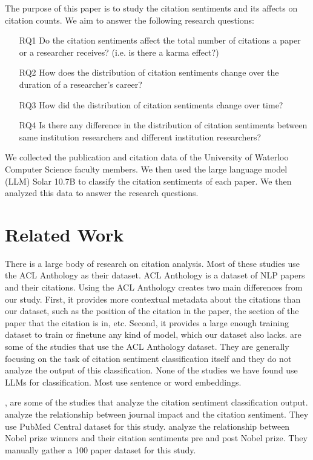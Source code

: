 \documentclass[sigconf]{acmart}
\begin{document}
The purpose of this paper is to study the citation sentiments and its affects
on citation counts. We aim to answer the following research 
questions:

\begin{enumerate}
    \item[RQ1] Do the citation sentiments affect the total number of
    citations a paper or a researcher receives? (i.e. is there a karma effect?)
    \item[RQ2] How does the distribution of citation sentiments change over the
    duration of a researcher's career?
    \item[RQ3] How did the distribution of citation sentiments change over time?
    \item[RQ4] Is there any difference in the distribution of citation sentiments
    between same institution researchers and different institution researchers? 
\end{enumerate} 

We collected the publication and citation data of
the University of Waterloo Computer Science faculty members. We then used
the large language model (LLM) Solar 10.7B \cite{upstage2023solar} to classify the citation 
sentiments of each paper. We then analyzed this data to answer the research questions.

\section{Related Work}
There is a large body of research on citation analysis. Most of these studies use the ACL Anthology \cite{bird2008acl} as their dataset. ACL Anthology is a dataset of NLP papers and their citations. Using the ACL Anthology creates two main differences from our study. First, it provides more contextual metadata about the citations than our dataset, such as the position of the citation in the paper, the section of the paper that the citation is in, etc. Second, it provides a large enough training dataset to train or finetune any kind of model, which our dataset also lacks. \cite{athar2011sentiment, athar2012context, abu2013purpose, hernandez2015citation} are some of the studies that use the ACL Anthology dataset. They are generally focusing on the task of citation sentiment classification itself and they do not analyze the output of this classification. None of the studies we have found use LLMs for classification. Most use sentence or word embeddings.

\cite{yan2020relationship}, \cite{yan2020authors} are some of the studies that analyze the citation sentiment classification output. \cite{yan2020relationship} analyze the relationship between journal impact and the citation sentiment. They use PubMed Central dataset \cite{pubmed} for this study. \cite{yan2020authors} analyze the relationship between Nobel prize winners and their citation sentiments pre and post Nobel prize. They manually gather a 100 paper dataset for this study.
\end{document}
